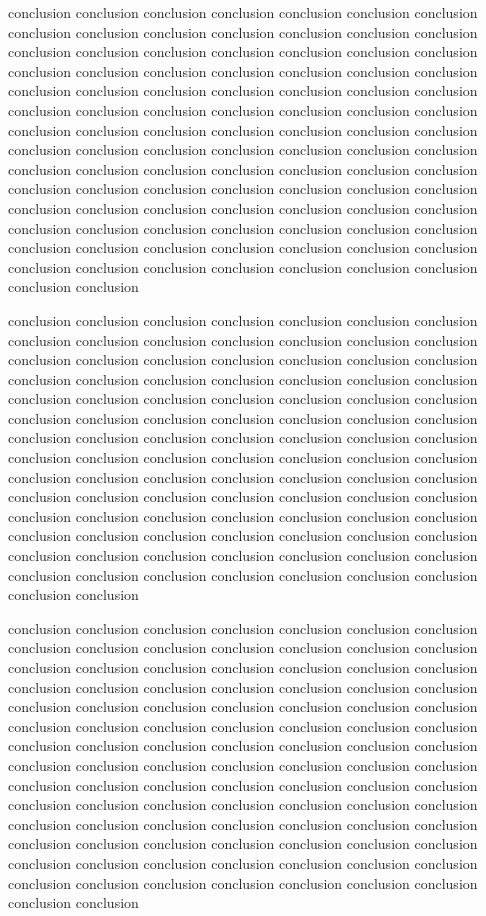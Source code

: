 \documentclass[platex,ja=standard,12pt,a4paper,twoside,onecolumn,fleqn,dvipdfmx,english]{bxjsbook}
\begin{document}
conclusion conclusion conclusion conclusion conclusion conclusion conclusion conclusion conclusion conclusion conclusion conclusion conclusion conclusion conclusion conclusion conclusion conclusion conclusion conclusion conclusion conclusion conclusion conclusion conclusion conclusion conclusion conclusion conclusion conclusion conclusion conclusion conclusion conclusion conclusion conclusion conclusion conclusion conclusion conclusion conclusion conclusion conclusion conclusion conclusion conclusion conclusion conclusion conclusion conclusion conclusion conclusion conclusion conclusion conclusion conclusion conclusion conclusion conclusion conclusion conclusion conclusion conclusion conclusion conclusion conclusion conclusion conclusion conclusion conclusion conclusion conclusion conclusion conclusion conclusion conclusion conclusion conclusion conclusion conclusion conclusion conclusion conclusion conclusion conclusion conclusion conclusion conclusion conclusion conclusion conclusion conclusion conclusion conclusion conclusion conclusion conclusion conclusion conclusion conclusion

conclusion conclusion conclusion conclusion conclusion conclusion conclusion conclusion conclusion conclusion conclusion conclusion conclusion conclusion conclusion conclusion conclusion conclusion conclusion conclusion conclusion conclusion conclusion conclusion conclusion conclusion conclusion conclusion conclusion conclusion conclusion conclusion conclusion conclusion conclusion conclusion conclusion conclusion conclusion conclusion conclusion conclusion conclusion conclusion conclusion conclusion conclusion conclusion conclusion conclusion conclusion conclusion conclusion conclusion conclusion conclusion conclusion conclusion conclusion conclusion conclusion conclusion conclusion conclusion conclusion conclusion conclusion conclusion conclusion conclusion conclusion conclusion conclusion conclusion conclusion conclusion conclusion conclusion conclusion conclusion conclusion conclusion conclusion conclusion conclusion conclusion conclusion conclusion conclusion conclusion conclusion conclusion conclusion conclusion conclusion conclusion conclusion conclusion conclusion conclusion

conclusion conclusion conclusion conclusion conclusion conclusion conclusion conclusion conclusion conclusion conclusion conclusion conclusion conclusion conclusion conclusion conclusion conclusion conclusion conclusion conclusion conclusion conclusion conclusion conclusion conclusion conclusion conclusion conclusion conclusion conclusion conclusion conclusion conclusion conclusion conclusion conclusion conclusion conclusion conclusion conclusion conclusion conclusion conclusion conclusion conclusion conclusion conclusion conclusion conclusion conclusion conclusion conclusion conclusion conclusion conclusion conclusion conclusion conclusion conclusion conclusion conclusion conclusion conclusion conclusion conclusion conclusion conclusion conclusion conclusion conclusion conclusion conclusion conclusion conclusion conclusion conclusion conclusion conclusion conclusion conclusion conclusion conclusion conclusion conclusion conclusion conclusion conclusion conclusion conclusion conclusion conclusion conclusion conclusion conclusion conclusion conclusion conclusion conclusion conclusion
\end{document}
